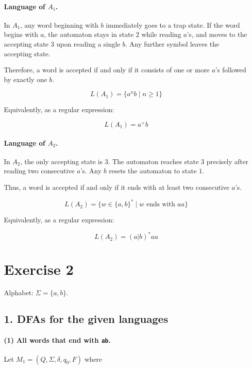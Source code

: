\documentclass{article}
\theoremstyle{theorem}
\theoremstyle{definition}
\theoremstyle{remark}
\begin{document}
\paragraph{Language of $A_1$.}

In $A_1$, any word beginning with $b$ immediately goes to a trap state.
If the word begins with $a$, the automaton stays in state $2$ while
reading $a$'s, and moves to the accepting state $3$ upon reading a
single $b$. Any further symbol leaves the accepting state.

Therefore, a word is accepted if and only if it consists of one or more
$a$'s followed by exactly one $b$.

\[
L(A_1) = \{ a^n b \mid n \ge 1 \}
\]

Equivalently, as a regular expression:

\[
L(A_1) = a^+ b
\]

\paragraph{Language of $A_2$.}

In $A_2$, the only accepting state is $3$. The automaton reaches state
$3$ precisely after reading two consecutive $a$'s. Any $b$ resets the
automaton to state $1$.

Thus, a word is accepted if and only if it ends with at least two
consecutive $a$'s.

\[
L(A_2) = \{ w \in \{a,b\}^* \mid w \text{ ends with } aa \}
\]

Equivalently, as a regular expression:

\[
L(A_2) = (a|b)^* aa
\]

\section*{Exercise 2}

Alphabet: $\Sigma = \{a,b\}$.

\subsection*{1. DFAs for the given languages}

\paragraph{(1) All words that end with \texttt{ab}.}

Let $M_1 = (Q,\Sigma,\delta,q_0,F)$ where
\end{document}
